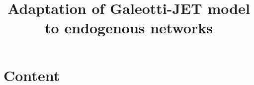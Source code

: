 \documentclass[12pt]{article}
\begin{document}
	
\title{Adaptation of Galeotti-JET model to endogenous networks}

\maketitle
\section{Content}












\end{document}
